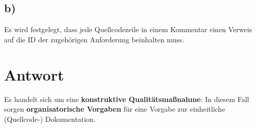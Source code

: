 \subsection*{b)}

Es wird festgelegt, dass jede Quellcodezeile in einem Kommentar einen Verweis auf die ID der zugehörigen Anforderung beinhalten muss.

\section*{Antwort}
Es handelt sich um eine \textbf{konstruktive Qualitätsmaßnahme}: In diesem Fall sorgen  \textbf{organisatorische Vorgaben} für eine Vorgabe zur einheitliche (Quellcode-) Dokumentation.
